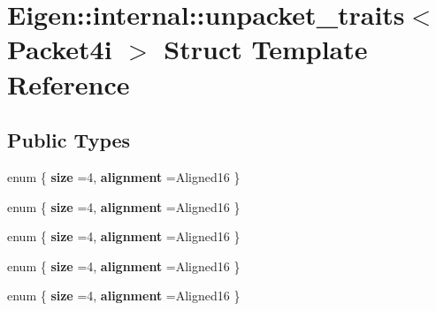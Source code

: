 \hypertarget{struct_eigen_1_1internal_1_1unpacket__traits_3_01_packet4i_01_4}{}\section{Eigen\+:\+:internal\+:\+:unpacket\+\_\+traits$<$ Packet4i $>$ Struct Template Reference}
\label{struct_eigen_1_1internal_1_1unpacket__traits_3_01_packet4i_01_4}
\subsection*{Public Types}
\begin{DoxyCompactItemize}
\item 
\mbox{\label{struct_eigen_1_1internal_1_1unpacket__traits_3_01_packet4i_01_4_acbbcc589883dcfc33db500009f17156d}} 
enum \{ {\bfseries size} =4, 
{\bfseries alignment} =Aligned16
 \}
\item 
\mbox{\label{struct_eigen_1_1internal_1_1unpacket__traits_3_01_packet4i_01_4_a05aa4e04b51a048cdfd84779433c006b}} 
enum \{ {\bfseries size} =4, 
{\bfseries alignment} =Aligned16
 \}
\item 
\mbox{\label{struct_eigen_1_1internal_1_1unpacket__traits_3_01_packet4i_01_4_a4d3040e9855904c563e95e24054b693c}} 
enum \{ {\bfseries size} =4, 
{\bfseries alignment} =Aligned16
 \}
\item 
\mbox{\label{struct_eigen_1_1internal_1_1unpacket__traits_3_01_packet4i_01_4_acc538c9073f10ef8b0dce0acefe6ad7a}} 
enum \{ {\bfseries size} =4, 
{\bfseries alignment} =Aligned16
 \}
\item 
\mbox{\label{struct_eigen_1_1internal_1_1unpacket__traits_3_01_packet4i_01_4_a6cd5c993cafad117085b99bb42508f24}} 
enum \{ {\bfseries size} =4, 
{\bfseries alignment} =Aligned16
 \}
\item 
\mbox{\label{struct_eigen_1_1internal_1_1unpacket__traits_3_01_packet4i_01_4_a06f7bb041fcae38e3d7313ba2a943fcb}} 

\end{DoxyCompactItemize}
